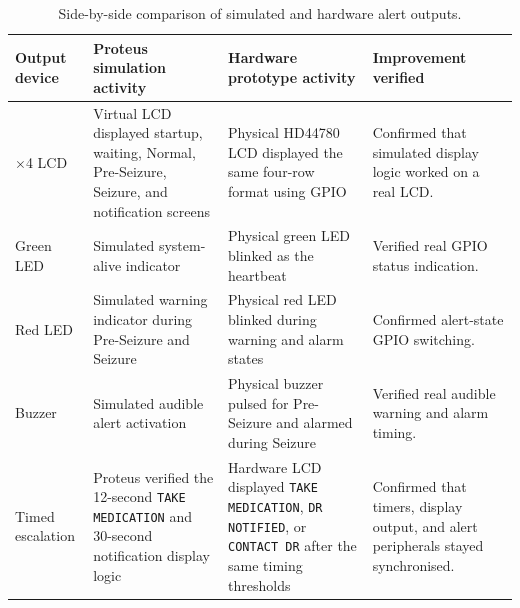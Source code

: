 \documentclass[12pt, a4paper]{report}
\begin{document}
\begin{table}[!htbp]
  \centering
  \caption{Side-by-side comparison of simulated and hardware alert outputs.}
  \label{tab:simulation_hardware_outputs}
  \tiny
  \setlength{\tabcolsep}{3pt}
  \renewcommand{\arraystretch}{1.08}
  \begin{tabularx}{\textwidth}{>{\raggedright\arraybackslash}p{2.4cm}
                              >{\raggedright\arraybackslash}p{3.2cm}
                              >{\raggedright\arraybackslash}p{3.2cm}
                              >{\raggedright\arraybackslash}X}
    \toprule
    \textbf{Output device} & \textbf{Proteus simulation activity} &
    \textbf{Hardware prototype activity} & \textbf{Improvement verified} \\
    \midrule
    20$\times$4 LCD &
    Virtual LCD displayed startup, waiting, Normal, Pre-Seizure, Seizure,
    and notification screens &
    Physical HD44780 LCD displayed the same four-row format using GPIO &
    Confirmed that simulated display logic worked on a real LCD. \\
    Green LED &
    Simulated system-alive indicator &
    Physical green LED blinked as the heartbeat &
    Verified real GPIO status indication. \\
    Red LED &
    Simulated warning indicator during Pre-Seizure and Seizure &
    Physical red LED blinked during warning and alarm states &
    Confirmed alert-state GPIO switching. \\
    Buzzer &
    Simulated audible alert activation &
    Physical buzzer pulsed for Pre-Seizure and alarmed during Seizure &
    Verified real audible warning and alarm timing. \\
    Timed escalation &
    Proteus verified the 12-second \texttt{TAKE MEDICATION} and 30-second
    notification display logic &
    Hardware LCD displayed \texttt{TAKE MEDICATION}, \texttt{DR NOTIFIED},
    or \texttt{CONTACT DR} after the same timing thresholds &
    Confirmed that timers, display output, and alert peripherals stayed synchronised. \\
    \bottomrule
  \end{tabularx}
\end{table}
\end{document}

